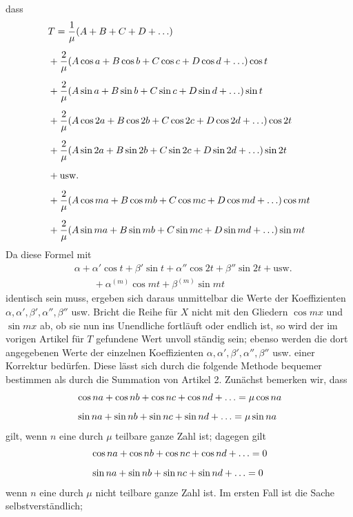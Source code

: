 dass
\[
\begin{aligned}
&T=\frac{1}{\mu}(A+B+C+D+\mathinner{.\,.\,.})\\[5pt]
&+\frac{2}{\mu}(A\cos a+B\cos b+C\cos c+D\cos d+\mathinner{.\,.\,.})\cos t\\[5pt]
&+\frac{2}{\mu}(A\sin a+B\sin b+C\sin c+D\sin d+\mathinner{.\,.\,.})\sin t\\[5pt]
&+\frac{2}{\mu}(A\cos2a+B\cos2b+C\cos2c+D\cos2d+\mathinner{.\,.\,.})\cos2t\\[5pt]
&+\frac{2}{\mu}(A\sin2a+B\sin2b+C\sin2c+D\sin2d+\mathinner{.\,.\,.})\sin2t\\[5pt]
&+\mathrm{usw.}\\[5pt]
&+\frac{2}{\mu}(A\cos ma+B\cos mb+C\cos mc+D\cos md+\mathinner{.\,.\,.})\cos mt\\[5pt]
&+\frac{2}{\mu}(A\sin ma+B\sin mb+C\sin mc+D\sin md+\mathinner{.\,.\,.})\sin mt
\end{aligned}
\]
Da diese Formel mit
\[
\begin{aligned}
&\alpha+\alpha'\cos t+\beta'\sin t+\alpha''\cos2t+\beta''\sin2t+\mathrm{usw.}\\[5pt]&\qquad{}+\alpha^{(m)}\cos mt+\beta^{(m)}\sin mt
\end{aligned}
\]
identisch sein muss, ergeben sich daraus unmittelbar die Werte der Koeffizienten \(\alpha,\alpha',\beta',\alpha'',\beta''\)
usw.
Bricht die Reihe für \(X\) nicht mit den Gliedern \(\cos mx\) und \(\sin mx\) ab, ob
sie nun ins Unendliche fortläuft oder endlich ist, so wird der im vorigen Artikel für \(T\) gefundene Wert unvoll%
ständig sein; ebenso werden die dort angegebenen Werte der einzelnen Koeffizienten \(\alpha,\alpha',\beta',\alpha'',\beta''\) usw.
einer Korrektur bedürfen. Diese lässt sich durch die folgende Methode bequemer bestimmen als durch die Summation von Artikel 2. Zunächst bemerken wir, dass
\[
\begin{aligned}
&\cos na+\cos nb+\cos nc+\cos nd+\mathinner{.\,.\,.}=\mu\cos na\\[5pt]
&\sin na+\sin nb+\sin nc+\sin nd+\mathinner{.\,.\,.}=\mu\sin na
\end{aligned}
\]
gilt, wenn \(n\) eine durch \(\mu\) teilbare ganze Zahl ist; dagegen gilt
\[
\begin{aligned}
&\cos na+\cos nb+\cos nc+\cos nd+\mathinner{.\,.\,.}=0\\[5pt]
&\sin na+\sin nb+\sin nc+\sin nd+\mathinner{.\,.\,.}=0
\end{aligned}
\]
wenn \(n\) eine durch \(\mu\) nicht teilbare ganze Zahl ist. Im ersten Fall ist die Sache selbstverständlich;

